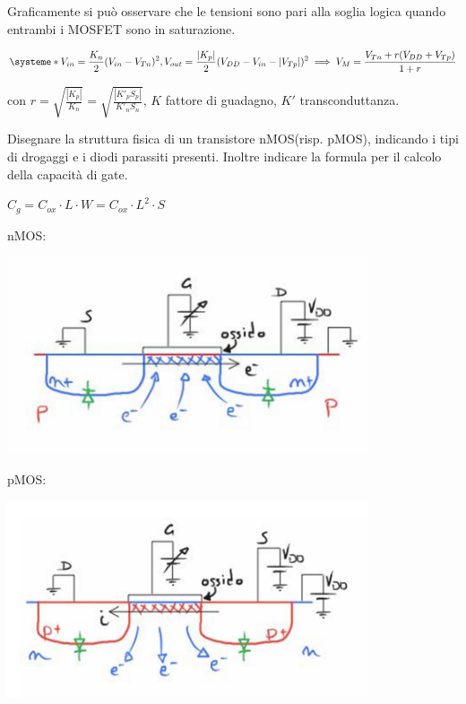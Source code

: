 \documentclass[answers,a4paper,12pt]{exam}
\begin{document}
\begin{questions}
\begin{solutionorbox}[5cm]
{    }
    Graficamente si può osservare che le tensioni sono pari alla soglia logica quando entrambi i MOSFET sono in saturazione.
    
    \[
        \systeme*{V_{in} = \frac{K_n}{2} (V_{in} - V_{Tn})^2, V_{out} = \frac{|K_p|}{2} (V_{DD} - V_{in} - |V_{Tp}|)^2 } \implies V_M = \frac{V_{Tn} + r ( V_{DD} + V_{Tp} )}{1 + r}
    \]
    
    con $ r =\sqrt{\frac{|K_p|}{K_n}} = \sqrt{\frac{|K'_p S_p|}{K'_n S_n}}$, $K$ fattore di guadagno, $K'$ transconduttanza.
\end{solutionorbox}
\question Disegnare la struttura fisica di un transistore nMOS(risp. pMOS), indicando i tipi di drogaggi e i
diodi parassiti presenti. Inoltre indicare la formula per il calcolo della
capacità di gate.
\begin{solutionorbox}[5cm]

$C_g = C_{ox} \cdot L \cdot W = C_{ox} \cdot L^2 \cdot S$

nMOS:

{\centering

\includegraphics[width=0.8\textwidth]{nMOS.png}

}

pMOS:

{\centering

\includegraphics[width=0.8\textwidth]{pMOS.png}

}
\end{solutionorbox}


\end{questions}
\end{document}
